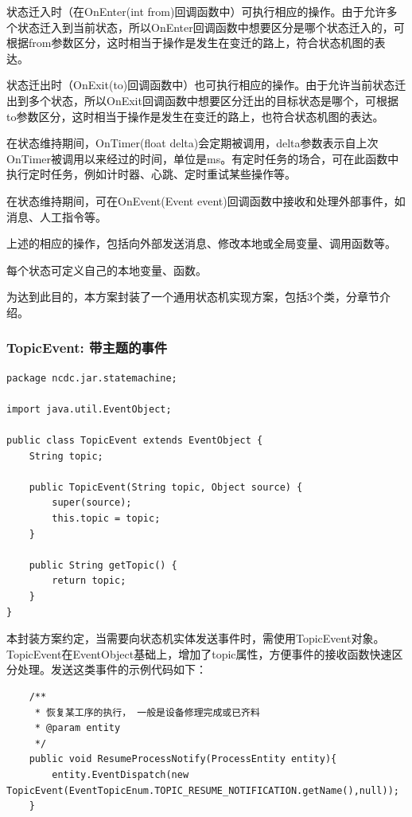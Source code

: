 状态迁入时（在OnEnter(int from)回调函数中）可执行相应的操作。由于允许多个状态迁入到当前状态，所以OnEnter回调函数中想要区分是哪个状态迁入的，可根据from参数区分，这时相当于操作是发生在变迁的路上，符合状态机图的表达。

状态迁出时（OnExit(to)回调函数中）也可执行相应的操作。由于允许当前状态迁出到多个状态，所以OnExit回调函数中想要区分迁出的目标状态是哪个，可根据to参数区分，这时相当于操作是发生在变迁的路上，也符合状态机图的表达。

在状态维持期间，OnTimer(float delta)会定期被调用，delta参数表示自上次OnTimer被调用以来经过的时间，单位是ms。有定时任务的场合，可在此函数中执行定时任务，例如计时器、心跳、定时重试某些操作等。

在状态维持期间，可在OnEvent(Event event)回调函数中接收和处理外部事件，如消息、人工指令等。

上述的相应的操作，包括向外部发送消息、修改本地或全局变量、调用函数等。

每个状态可定义自己的本地变量、函数。

为达到此目的，本方案封装了一个通用状态机实现方案，包括3个类，分章节介绍。

\subsubsection{TopicEvent: 带主题的事件}
\begin{lstlisting}
package ncdc.jar.statemachine;

import java.util.EventObject;

public class TopicEvent extends EventObject {
    String topic;

    public TopicEvent(String topic, Object source) {
        super(source);
        this.topic = topic;
    }

    public String getTopic() {
        return topic;
    }
}
\end{lstlisting}\vspace{-30pt}
本封装方案约定，当需要向状态机实体发送事件时，需使用TopicEvent对象。TopicEvent在EventObject基础上，增加了topic属性，方便事件的接收函数快速区分处理。发送这类事件的示例代码如下：
\begin{lstlisting}
    /**
     * 恢复某工序的执行， 一般是设备修理完成或已齐料
     * @param entity
     */
    public void ResumeProcessNotify(ProcessEntity entity){
        entity.EventDispatch(new TopicEvent(EventTopicEnum.TOPIC_RESUME_NOTIFICATION.getName(),null));
    }

\end{lstlisting}\vspace{-30pt}

